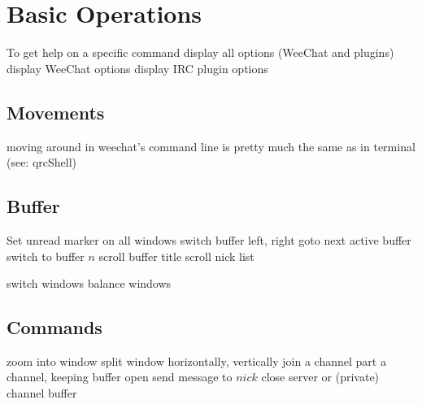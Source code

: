 
\def\content{\uppercase{Weechat}}
\def\shortcontent{\content}
\def\versionnumber{0.1}  %
\def\version{v\versionnumber\ \month\ \year}


\mytitle

\shortintro

\section{Basic Operations}{}
	{To get help on a specific command}
	{display all options (WeeChat and plugins)}
	{display WeeChat options}
	{display IRC plugin options}

\subsection{Movements}{moving around in weechat's command line is pretty much the same as in terminal (see: qrcShell)}

\subsection{Buffer}{}
	{Set unread marker on all windows}
	{switch buffer left, right}
	{goto next active buffer}
	{switch to buffer $n$}
	{scroll buffer title}
	{scroll nick list}

	{switch windows}
	{balance windows}

\subsection{Commands}{}
	{zoom into window}
	{split window horizontally, vertically}
	{join a channel}
	{part a channel, keeping buffer open}
	{send message to $nick$}
	{close server or (private) channel buffer}

